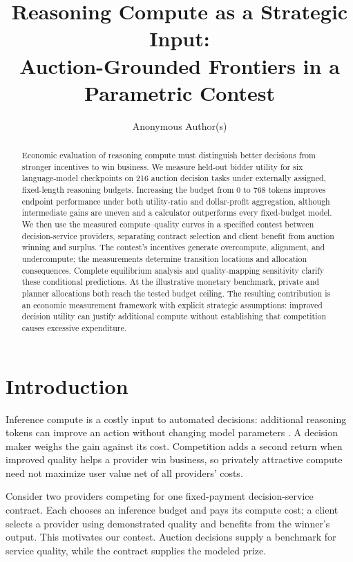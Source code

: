 \documentclass{article}
\title{Reasoning Compute as a Strategic Input:\\Auction-Grounded Frontiers in a Parametric Contest}
\author{Anonymous Author(s)}
\begin{document}
\maketitle

\begin{abstract}
Economic evaluation of reasoning compute must distinguish better decisions from stronger incentives to win business. We measure held-out bidder utility for six language-model checkpoints on 216 auction decision tasks under externally assigned, fixed-length reasoning budgets. Increasing the budget from 0 to 768 tokens improves endpoint performance under both utility-ratio and dollar-profit aggregation, although intermediate gains are uneven and a calculator outperforms every fixed-budget model. We then use the measured compute--quality curves in a specified contest between decision-service providers, separating contract selection and client benefit from auction winning and surplus. The contest's incentives generate overcompute, alignment, and undercompute; the measurements determine transition locations and allocation consequences. Complete equilibrium analysis and quality-mapping sensitivity clarify these conditional predictions. At the illustrative monetary benchmark, private and planner allocations both reach the tested budget ceiling. The resulting contribution is an economic measurement framework with explicit strategic assumptions: improved decision utility can justify additional compute without establishing that competition causes excessive expenditure.
\end{abstract}

\section{Introduction}
\label{sec:introduction}

Inference compute is a costly input to automated decisions: additional reasoning tokens can improve an action without changing model parameters \citep{snell2024scaling,wu2024inference,alomrani2025budget}. A decision maker weighs the gain against its cost. Competition adds a second return when improved quality helps a provider win business, so privately attractive compute need not maximize user value net of all providers' costs.

Consider two providers competing for one fixed-payment decision-service contract. Each chooses an inference budget and pays its compute cost; a client selects a provider using demonstrated quality and benefits from the winner's output. This motivates our contest. Auction decisions supply a benchmark for service quality, while the contract supplies the modeled prize.
\end{document}
